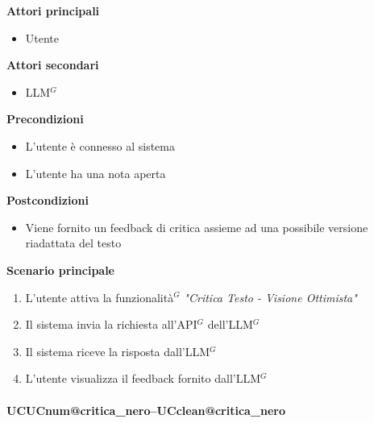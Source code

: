 \documentclass[a4paper,10pt]{article}
\makeatletter
\def\UCText#1{UC\csname UCnum@#1\endcsname\space--\space\csname UCclean@#1\endcsname}%
\makeatother
\begin{document}
    \textbf{Attori principali}
    \begin{itemize}
        \item Utente
    \end{itemize}
    \textbf{Attori secondari}
    \begin{itemize}
        \item LLM$^G$
    \end{itemize}
    \textbf{Precondizioni}
    \begin{itemize}
        \item L'utente è connesso al sistema
        \item L'utente ha una nota aperta
    \end{itemize}
    \textbf{Postcondizioni}
    \begin{itemize}
        \item Viene fornito un feedback di critica assieme ad una possibile versione riadattata del testo
    \end{itemize}
    \textbf{Scenario principale}
    \begin{enumerate}
        \item L'utente attiva la funzionalità$^G$ \textit{"Critica Testo - Visione Ottimista"}
        \item Il sistema invia la richiesta all'API$^G$ dell'LLM$^G$
        \item Il sistema riceve la risposta dall'LLM$^G$
        \item L'utente visualizza il feedback fornito dall'LLM$^G$
    \end{enumerate}

    \paragraph{\UCText{critica_nero}}
\end{document}
